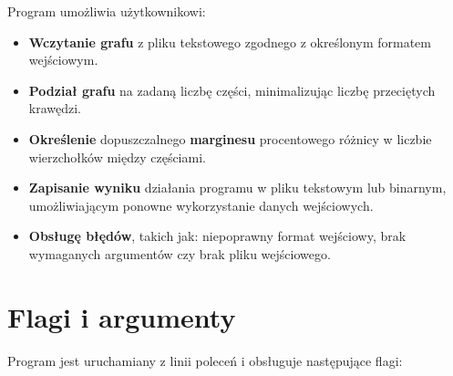 \documentclass{article}
\begin{document}
Program umożliwia użytkownikowi:

\begin{itemize}
    \item \textbf{Wczytanie grafu} z pliku tekstowego zgodnego z określonym formatem wejściowym.
    \item \textbf{Podział grafu} na zadaną liczbę części, minimalizując liczbę przeciętych krawędzi.
    \item \textbf{Określenie} dopuszczalnego \textbf{marginesu} procentowego różnicy w liczbie wierzchołków między częściami.
    \item \textbf{Zapisanie wyniku} działania programu w pliku tekstowym lub binarnym, umożliwiającym ponowne wykorzystanie danych wejściowych.
    \item \textbf{Obsługę błędów}, takich jak: niepoprawny format wejściowy, brak wymaganych argumentów czy brak pliku wejściowego.
\end{itemize}



\section{Flagi i argumenty}

Program jest uruchamiany z linii poleceń i obsługuje następujące flagi:
\end{document}
